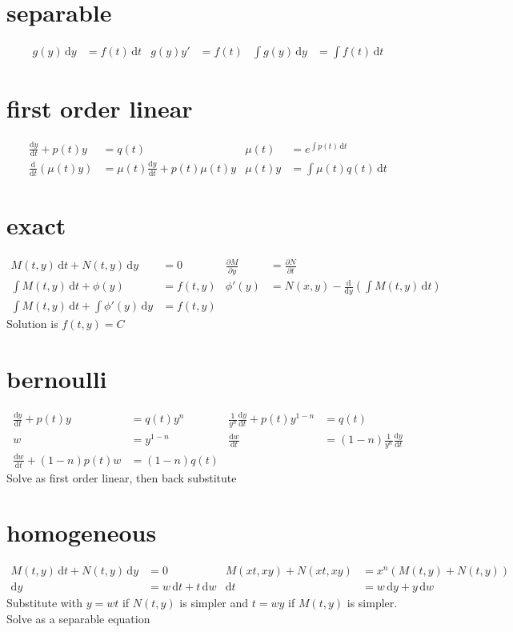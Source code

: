 \documentclass{article}
\begin{document}
\section*{separable}
\begin{align*}
g(y)\,\mathrm{d}y&=f(t)\,\mathrm{d}t & g(y)y'&=f(t) & \int{g(y)\,\mathrm{d}y}&=\int{f(t)\,\mathrm{d}t}
\end{align*}

\section*{first order linear}
\begin{align*}
\frac{\mathrm{d}y}{\mathrm{d}t}+p(t)y&=q(t) & \mu(t)&=e^{\int{p(t)\,\mathrm{d}t}}\\
\frac{\mathrm{d}}{\mathrm{d}t}\left(\mu(t)y\right)&=\mu(t)\frac{\mathrm{d}y}{\mathrm{d}t}+p(t)\mu(t)y & \mu(t)y&=\int{\mu(t)q(t)\,\mathrm{d}t}
\end{align*}

\section*{exact}
\begin{align*}
M(t,y)\,\mathrm{d}t+N(t,y)\,\mathrm{d}y&=0 & \frac{\partial M}{\partial y}&=\frac{\partial N}{\partial t}\\
\int{M(t,y)\,\mathrm{d}t}+\phi(y)&=f(t,y) & \phi'(y)&=N(x,y)-\frac{\mathrm{d}}{\mathrm{d}y}\left(\int{M(t,y)\,\mathrm{d}t}\right)\\
\int{M(t,y)\,\mathrm{d}t}+\int{\phi'(y)\,\mathrm{d}y}&=f(t,y)
\end{align*}
Solution is $f(t,y)=C$

\section*{bernoulli}
\begin{align*}
\frac{\mathrm{d}y}{\mathrm{d}t}+p(t)y&=q(t)y^n & \frac{1}{y^n}\frac{\mathrm{d}y}{\mathrm{d}t}+p(t)y^{1-n}&=q(t)\\
w&=y^{1-n} & \frac{\mathrm{d}w}{\mathrm{d}t}&=(1-n)\frac{1}{y^{n}}\frac{\mathrm{d}y}{\mathrm{d}t}\\
\frac{\mathrm{d}w}{\mathrm{d}t}+(1-n)p(t)w&=(1-n)q(t)
\end{align*}
Solve as first order linear, then back substitute

\section*{homogeneous}
\begin{align*}
M(t,y)\,\mathrm{d}t+N(t,y)\,\mathrm{d}y&=0 & M(xt,xy)+N(xt,xy)&=x^n\left(M(t,y)+N(t,y)\right)\\
\mathrm{d}y&=w\,\mathrm{d}t+t\,\mathrm{d}w &\mathrm{d}t&=w\,\mathrm{d}y+y\,\mathrm{d}w
\end{align*}
Substitute with $y=wt$ if $N(t,y)$ is simpler and $t=wy$ if $M(t,y)$ is simpler. Solve as a separable equation
\end{document}
